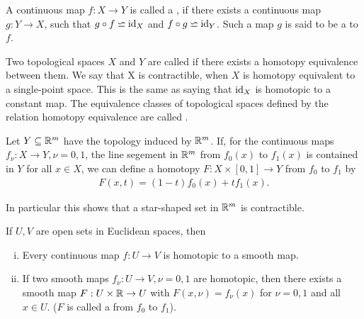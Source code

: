 \begin{definition}\label{def:6-4}
  A continuous map $f:X\to Y$ is called a , if
there exists a continuous map $g:Y\to X$, such that $g\circ f \backsimeq \operatorname{id}_X$ and $f\circ g\backsimeq \operatorname{id}_Y$.
Such a map $g$ is said to be a  to $f$.
\end{definition}

Two topological spaces $X$ and $Y$ are called  if there exists a
homotopy equivalence between them. We say that X is contractible, when $X$ is
homotopy equivalent to a single-point space. This is the same as saying that $\operatorname{id}_X$
is homotopic to a constant map. The equivalence classes of topological spaces
defined by the relation homotopy equivalence are called .

\begin{example}\label{example:6-5}
Let $Y\subseteq\mathbb{R}^m$ have the topology induced by $\mathbb{R}^m$. If, for the continuous maps $f_\nu:X\to Y, \nu=0, 1$, the line segement
in $\mathbb{R}^m$ from $f_0(x)$ to $f_1(x)$ is contained in $Y$ for all $x\in X$, we can define a homotopy $F:X\times [0, 1]\to Y$  from 
$f_0$ to $f_1$ by 
\begin{align*}
  F(x, t) = (1-t)f_0(x) + tf_1(x).
\end{align*}

In particular this shows that a star-shaped set in $\mathbb{R}^m$ is contractible.
\end{example}


\begin{lemma}\label{lemma:6-6}
If $U, V$ are open sets in Euclidean spaces, then 
\begin{enumerate}[(i)]
  \item Every continuous map $f:U\to V$ is homotopic to a smooth map.
  \item If two smooth maps $f_\nu:U\to V, \nu=0, 1$ are homotopic, then there exists a smooth map $F:U\times\mathbb{R}\to U$ with 
    $F(x, \nu) = f_\nu(x)$ for $\nu=0, 1$ and all $x\in U$. ($F$  is called a  from $f_0$ to $f_1$).
\end{enumerate}
\end{lemma}

